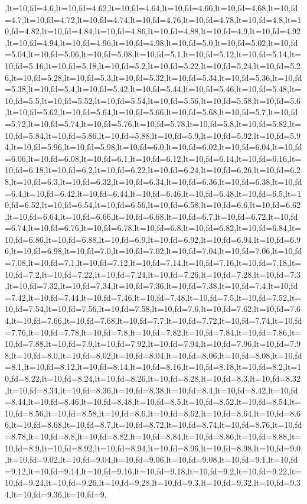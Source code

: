 \documentclass[a4paper,10pt]{article}
\begin{document}
\begin{enumerate}[resume]
,lt=10,fd=4.6,lt=10,fd=4.62,lt=10,fd=4.64,lt=10,fd=4.66,lt=10,fd=4.68,lt=10,fd=4.7,lt=10,fd=4.72,lt=10,fd=4.74,lt=10,fd=4.76,lt=10,fd=4.78,lt=10,fd=4.8,lt=10,fd=4.82,lt=10,fd=4.84,lt=10,fd=4.86,lt=10,fd=4.88,lt=10,fd=4.9,lt=10,fd=4.92,lt=10,fd=4.94,lt=10,fd=4.96,lt=10,fd=4.98,lt=10,fd=5.0,lt=10,fd=5.02,lt=10,fd=5.04,lt=10,fd=5.06,lt=10,fd=5.08,lt=10,fd=5.1,lt=10,fd=5.12,lt=10,fd=5.14,lt=10,fd=5.16,lt=10,fd=5.18,lt=10,fd=5.2,lt=10,fd=5.22,lt=10,fd=5.24,lt=10,fd=5.26,lt=10,fd=5.28,lt=10,fd=5.3,lt=10,fd=5.32,lt=10,fd=5.34,lt=10,fd=5.36,lt=10,fd=5.38,lt=10,fd=5.4,lt=10,fd=5.42,lt=10,fd=5.44,lt=10,fd=5.46,lt=10,fd=5.48,lt=10,fd=5.5,lt=10,fd=5.52,lt=10,fd=5.54,lt=10,fd=5.56,lt=10,fd=5.58,lt=10,fd=5.6,lt=10,fd=5.62,lt=10,fd=5.64,lt=10,fd=5.66,lt=10,fd=5.68,lt=10,fd=5.7,lt=10,fd=5.72,lt=10,fd=5.74,lt=10,fd=5.76,lt=10,fd=5.78,lt=10,fd=5.8,lt=10,fd=5.82,lt=10,fd=5.84,lt=10,fd=5.86,lt=10,fd=5.88,lt=10,fd=5.9,lt=10,fd=5.92,lt=10,fd=5.94,lt=10,fd=5.96,lt=10,fd=5.98,lt=10,fd=6.0,lt=10,fd=6.02,lt=10,fd=6.04,lt=10,fd=6.06,lt=10,fd=6.08,lt=10,fd=6.1,lt=10,fd=6.12,lt=10,fd=6.14,lt=10,fd=6.16,lt=10,fd=6.18,lt=10,fd=6.2,lt=10,fd=6.22,lt=10,fd=6.24,lt=10,fd=6.26,lt=10,fd=6.28,lt=10,fd=6.3,lt=10,fd=6.32,lt=10,fd=6.34,lt=10,fd=6.36,lt=10,fd=6.38,lt=10,fd=6.4,lt=10,fd=6.42,lt=10,fd=6.44,lt=10,fd=6.46,lt=10,fd=6.48,lt=10,fd=6.5,lt=10,fd=6.52,lt=10,fd=6.54,lt=10,fd=6.56,lt=10,fd=6.58,lt=10,fd=6.6,lt=10,fd=6.62,lt=10,fd=6.64,lt=10,fd=6.66,lt=10,fd=6.68,lt=10,fd=6.7,lt=10,fd=6.72,lt=10,fd=6.74,lt=10,fd=6.76,lt=10,fd=6.78,lt=10,fd=6.8,lt=10,fd=6.82,lt=10,fd=6.84,lt=10,fd=6.86,lt=10,fd=6.88,lt=10,fd=6.9,lt=10,fd=6.92,lt=10,fd=6.94,lt=10,fd=6.96,lt=10,fd=6.98,lt=10,fd=7.0,lt=10,fd=7.02,lt=10,fd=7.04,lt=10,fd=7.06,lt=10,fd=7.08,lt=10,fd=7.1,lt=10,fd=7.12,lt=10,fd=7.14,lt=10,fd=7.16,lt=10,fd=7.18,lt=10,fd=7.2,lt=10,fd=7.22,lt=10,fd=7.24,lt=10,fd=7.26,lt=10,fd=7.28,lt=10,fd=7.3,lt=10,fd=7.32,lt=10,fd=7.34,lt=10,fd=7.36,lt=10,fd=7.38,lt=10,fd=7.4,lt=10,fd=7.42,lt=10,fd=7.44,lt=10,fd=7.46,lt=10,fd=7.48,lt=10,fd=7.5,lt=10,fd=7.52,lt=10,fd=7.54,lt=10,fd=7.56,lt=10,fd=7.58,lt=10,fd=7.6,lt=10,fd=7.62,lt=10,fd=7.64,lt=10,fd=7.66,lt=10,fd=7.68,lt=10,fd=7.7,lt=10,fd=7.72,lt=10,fd=7.74,lt=10,fd=7.76,lt=10,fd=7.78,lt=10,fd=7.8,lt=10,fd=7.82,lt=10,fd=7.84,lt=10,fd=7.86,lt=10,fd=7.88,lt=10,fd=7.9,lt=10,fd=7.92,lt=10,fd=7.94,lt=10,fd=7.96,lt=10,fd=7.98,lt=10,fd=8.0,lt=10,fd=8.02,lt=10,fd=8.04,lt=10,fd=8.06,lt=10,fd=8.08,lt=10,fd=8.1,lt=10,fd=8.12,lt=10,fd=8.14,lt=10,fd=8.16,lt=10,fd=8.18,lt=10,fd=8.2,lt=10,fd=8.22,lt=10,fd=8.24,lt=10,fd=8.26,lt=10,fd=8.28,lt=10,fd=8.3,lt=10,fd=8.32,lt=10,fd=8.34,lt=10,fd=8.36,lt=10,fd=8.38,lt=10,fd=8.4,lt=10,fd=8.42,lt=10,fd=8.44,lt=10,fd=8.46,lt=10,fd=8.48,lt=10,fd=8.5,lt=10,fd=8.52,lt=10,fd=8.54,lt=10,fd=8.56,lt=10,fd=8.58,lt=10,fd=8.6,lt=10,fd=8.62,lt=10,fd=8.64,lt=10,fd=8.66,lt=10,fd=8.68,lt=10,fd=8.7,lt=10,fd=8.72,lt=10,fd=8.74,lt=10,fd=8.76,lt=10,fd=8.78,lt=10,fd=8.8,lt=10,fd=8.82,lt=10,fd=8.84,lt=10,fd=8.86,lt=10,fd=8.88,lt=10,fd=8.9,lt=10,fd=8.92,lt=10,fd=8.94,lt=10,fd=8.96,lt=10,fd=8.98,lt=10,fd=9.0,lt=10,fd=9.02,lt=10,fd=9.04,lt=10,fd=9.06,lt=10,fd=9.08,lt=10,fd=9.1,lt=10,fd=9.12,lt=10,fd=9.14,lt=10,fd=9.16,lt=10,fd=9.18,lt=10,fd=9.2,lt=10,fd=9.22,lt=10,fd=9.24,lt=10,fd=9.26,lt=10,fd=9.28,lt=10,fd=9.3,lt=10,fd=9.32,lt=10,fd=9.34,lt=10,fd=9.36,lt=10,fd=9.
\end{enumerate}
\end{document}
